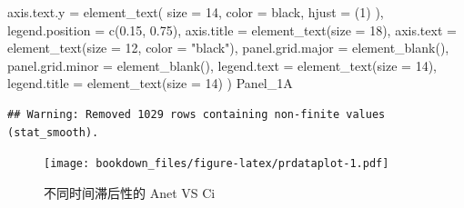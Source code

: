 \documentclass[
]{krantz}
\makeatletter
\newenvironment{Shaded}{\begin{snugshade}}{\end{snugshade}}
\newcommand{\AttributeTok}[1]{\textcolor[rgb]{0.77,0.63,0.00}{#1}}
\newcommand{\DecValTok}[1]{\textcolor[rgb]{0.00,0.00,0.81}{#1}}
\newcommand{\FloatTok}[1]{\textcolor[rgb]{0.00,0.00,0.81}{#1}}
\newcommand{\FunctionTok}[1]{\textcolor[rgb]{0.00,0.00,0.00}{#1}}
\newcommand{\NormalTok}[1]{#1}
\newcommand{\StringTok}[1]{\textcolor[rgb]{0.31,0.60,0.02}{#1}}
\newenvironment{kframe}{%
\medskip{}
\setlength{\fboxsep}{.8em}
 \def\at@end@of@kframe{}%
 \ifinner\ifhmode%
  \def\at@end@of@kframe{\end{minipage}}%
  \begin{minipage}{\columnwidth}%
 \fi\fi%
 \def\FrameCommand##1{\hskip\@totalleftmargin \hskip-\fboxsep
 \colorbox{shadecolor}{##1}\hskip-\fboxsep
     \hskip-\linewidth \hskip-\@totalleftmargin \hskip\columnwidth}%
 \MakeFramed {\advance\hsize-\width
   \@totalleftmargin\z@ \linewidth\hsize
   \@setminipage}}%
 {\par\unskip\endMakeFramed%
 \at@end@of@kframe}
\renewenvironment{Shaded}{\begin{kframe}}{\end{kframe}}
\makeatother
\begin{document}
\begin{Shaded}
\begin{Highlighting}[]
    \AttributeTok{axis.text.y =}
      \FunctionTok{element\_text}\NormalTok{(}
        \AttributeTok{size =} \DecValTok{14}\NormalTok{,}
        \AttributeTok{color =} \StringTok{\textquotesingle{}black\textquotesingle{}}\NormalTok{,}
        \AttributeTok{hjust =}\NormalTok{ (}\DecValTok{1}\NormalTok{)}
\NormalTok{      ),}
    \AttributeTok{legend.position =} \FunctionTok{c}\NormalTok{(}\FloatTok{0.15}\NormalTok{, }\FloatTok{0.75}\NormalTok{),}
    \AttributeTok{axis.title =} \FunctionTok{element\_text}\NormalTok{(}\AttributeTok{size =} \DecValTok{18}\NormalTok{),}
    \AttributeTok{axis.text =} \FunctionTok{element\_text}\NormalTok{(}\AttributeTok{size =} \DecValTok{12}\NormalTok{, }\AttributeTok{color =} \StringTok{"black"}\NormalTok{),}
    \AttributeTok{panel.grid.major =} \FunctionTok{element\_blank}\NormalTok{(),}
    \AttributeTok{panel.grid.minor =} \FunctionTok{element\_blank}\NormalTok{(),}
    \AttributeTok{legend.text =} \FunctionTok{element\_text}\NormalTok{(}\AttributeTok{size =} \DecValTok{14}\NormalTok{),}
    \AttributeTok{legend.title =} \FunctionTok{element\_text}\NormalTok{(}\AttributeTok{size =} \DecValTok{14}\NormalTok{)}
\NormalTok{  )}
\NormalTok{Panel\_1A}
\end{Highlighting}
\end{Shaded}

\begin{verbatim}
## Warning: Removed 1029 rows containing non-finite values (stat_smooth).
\end{verbatim}

\begin{figure}
\centering
\texttt{[image: bookdown\_files/figure-latex/prdataplot-1.pdf]}
\caption{\label{fig:prdataplot}不同时间滞后性的 Anet VS Ci}
\end{figure}
\end{document}
